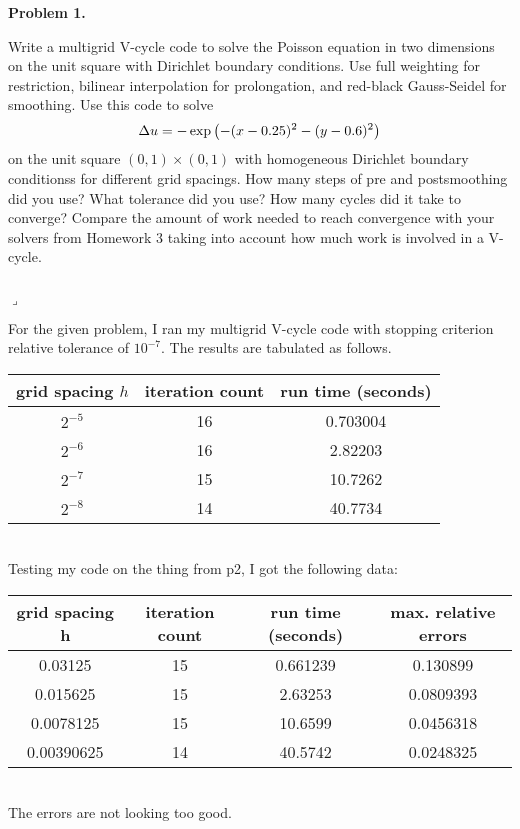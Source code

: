 \documentclass[12pt]{article}
\newenvironment{myprob}[1]
    {%
    \noindent{\Huge$\ulcorner$}\textbf{#1.}\begin{em}
    }
    { 
    \end{em} \\ \hphantom{l} \hfill {\Huge$\lrcorner$} }
\begin{document}
\rhead{\today}

{\let\newpage\relax} 


\begin{myprob}{Problem 1}
Write a multigrid V-cycle code to solve the Poisson equation in two dimensions on the unit square with Dirichlet boundary conditions. Use full weighting for restriction, bilinear interpolation for prolongation, and red-black Gauss-Seidel for smoothing.
Use this code to solve
$$\Delta u = -\exp\qty( - (x-0.25)^2 - (y-0.6)^2)$$
on the unit square $(0, 1) \times (0, 1)$ with homogeneous Dirichlet boundary conditionss for different grid spacings. How many steps of pre and postsmoothing did you use? What tolerance did you use? How many cycles did it take to converge? Compare the amount of work needed to reach convergence with your solvers from Homework 3 taking into account how much work is involved in a V-cycle.
\end{myprob}

For the given problem, I ran my multigrid V-cycle code with stopping criterion relative tolerance of $10^{-7}$. The results are tabulated as follows. \\
{
\centering
\begin{tabular}{||c|c|c||}
\hline \hline
   grid spacing $h$ &   iteration count &   run time (seconds) \\
\hline \hline
       $2^{-5}$    &                16 &             0.703004 \\
       $2^{-6}$    &                16 &             2.82203  \\
       $2^{-7}$   &                15 &            10.7262   \\
       $2^{-8}$  &                14 &            40.7734   \\
\hline \hline
\end{tabular}
}\\

Testing my code on the thing from p2, I got the following data: \\
{
\centering
\begin{tabular}{||c|c|c|c||}
\hline \hline
   grid spacing h &   iteration count &   run time (seconds) &   max. relative errors \\
\hline \hline
       0.03125    &                15 &             0.661239 &    0.130899  \\
       0.015625   &                15 &             2.63253  &    0.0809393 \\
       0.0078125  &                15 &            10.6599   &    0.0456318 \\
       0.00390625 &                14 &            40.5742   &    0.0248325 \\
\hline \hline
\end{tabular}
}\\
The errors are not looking too good.
\end{document}
